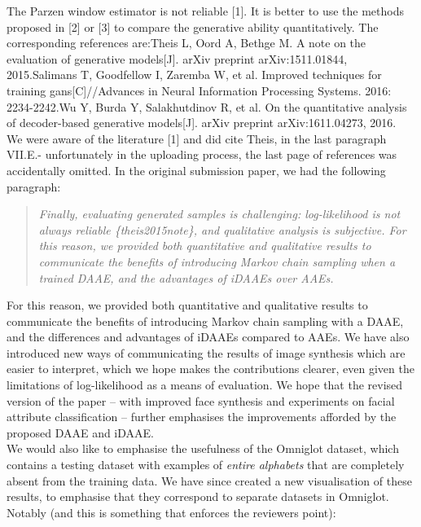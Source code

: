 \documentclass[a4paper,11pt]{article}
\begin{document}
{\color{blue}
The Parzen window estimator is not reliable [1]. It is better to use the methods proposed in [2] or [3] to compare the generative ability quantitatively. The corresponding references are:\newline
[1] Theis L, Oord A, Bethge M. A note on the evaluation of generative models[J]. arXiv preprint arXiv:1511.01844, 2015.\newline
[2] Salimans T, Goodfellow I, Zaremba W, et al. Improved techniques for training gans[C]//Advances in Neural Information Processing Systems. 2016: 2234-2242.\newline
[3] Wu Y, Burda Y, Salakhutdinov R, et al. On the quantitative analysis of decoder-based generative models[J]. arXiv preprint arXiv:1611.04273, 2016.\newline
}
\\

We were aware of the literature [1] and did cite Theis, in the last paragraph VII.E.- unfortunately in the uploading process, the last page of references was accidentally omitted. In the original submission paper, we had the following paragraph:

\begin{quote} {\it Finally, evaluating generated samples is challenging: log-likelihood is not always reliable \{theis2015note\}, and qualitative analysis is subjective. For this reason, we provided both quantitative and qualitative results to communicate the benefits of introducing Markov chain sampling when a trained DAAE, and the advantages of iDAAEs over AAEs. }
\end{quote}

For this reason, we provided both quantitative and qualitative results to communicate the benefits of introducing Markov chain sampling with a DAAE, and the differences and advantages of iDAAEs compared to AAEs. We have also introduced new ways of communicating the results of image synthesis which are easier to interpret, which we hope makes the contributions clearer, even given the limitations of log-likelihood as a means of evaluation. We hope that the revised version of the paper -- with improved face synthesis and experiments on facial attribute classification -- further emphasises the improvements afforded by the proposed DAAE and iDAAE.\\

We would also like to emphasise the usefulness of the Omniglot dataset, which contains a testing dataset with examples of {\em entire alphabets} that are completely absent from the training data. We have since created a new visualisation of these results, to emphasise that they correspond to separate datasets in Omniglot. Notably (and this is something that enforces the reviewers point):
\end{document}
